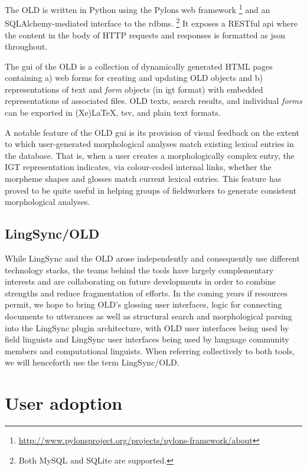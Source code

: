 \documentclass[11pt]{article}
\begin{document}
The OLD is written in Python using the Pylons web framework%
\footnote{\url{http://www.pylonsproject.org/projects/pylons-framework/about}} %
and an SQLAlchemy-mediated interface to the \gls{rdbms}.%
\footnote{Both MySQL and SQLite are supported.} %
It exposes a RESTful \gls{api} where the content in the body of HTTP requests
and responses is formatted as \gls{json} throughout.%

The \gls{gui} of the OLD is a collection of dynamically generated HTML pages
containing a) web forms for creating and updating OLD objects and b)
representations of text and \emph{form} objects (in \gls{igt} format) with
embedded representations of associated files. OLD texts, search results, and
individual \emph{forms} can be exported in (Xe)LaTeX, \gls{tsv}, and plain text
formats.

A notable feature of the OLD \gls{gui} is its provision of visual feedback on
the extent to which user-generated morphological analyses match existing
lexical entries in the database. That is, when a user creates a morphologically
complex entry, the IGT representation indicates, via colour-coded internal
links, whether the morpheme shapes and glosses match current lexical entries.
This feature has proved to be quite useful in helping groups of fieldworkers to
generate consistent morphological analyses.


\subsection{LingSync/OLD}

While LingSync and the OLD arose independently and consequently use different
technology stacks, the teams behind the tools have largely complementary
interests and are collaborating on future developments in order to combine
strengths and reduce fragmentation of efforts. In the coming years if resources
permit, we hope to bring OLD's glossing user interfaces, logic for connecting
documents to utterances as well as structural search and morphological parsing
into the LingSync plugin architecture, with OLD user interfaces being used by
field linguists and LingSync user interfaces being used by language community
members and computational linguists. When referring collectively to both tools,
we will henceforth use the term LingSync/OLD.


\section{User adoption}
\end{document}
